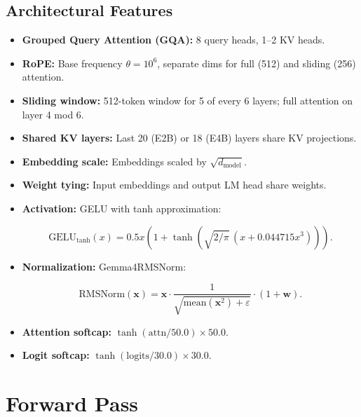 \documentclass[11pt,a4paper,openright]{book}
\begin{document}
\subsection{Architectural Features}

\begin{itemize}
	\item \textbf{Grouped Query Attention (GQA):} 8 query heads, 1--2 KV heads.
	\item \textbf{RoPE:} Base frequency $\theta = 10^6$, separate dims for full (512) and sliding (256) attention.
	\item \textbf{Sliding window:} 512-token window for 5 of every 6 layers; full attention on layer 4 mod 6.
	\item \textbf{Shared KV layers:} Last 20 (E2B) or 18 (E4B) layers share KV projections.
	\item \textbf{Embedding scale:} Embeddings scaled by $\sqrt{d_\text{model}}$.
	\item \textbf{Weight tying:} Input embeddings and output LM head share weights.
	\item \textbf{Activation:} GELU with tanh approximation:

	      \begin{equation}
		      \label{eq:gelu_tanh_inf}
		      \text{GELU}_\text{tanh}(x) = 0.5x\left(1 + \tanh\left(\sqrt{2/\pi}\,(x + 0.044715 x^3)\right)\right).
	      \end{equation}

	\item \textbf{Normalization:} Gemma4RMSNorm:

	      \begin{equation}
		      \label{eq:rmsnorm}
		      \text{RMSNorm}(\mathbf{x}) = \mathbf{x} \cdot \frac{1}{\sqrt{\text{mean}(\mathbf{x}^2) + \varepsilon}} \cdot (1 + \mathbf{w}).
	      \end{equation}

	\item \textbf{Attention softcap:} $\tanh(\text{attn} / 50.0) \times 50.0$.
	\item \textbf{Logit softcap:} $\tanh(\text{logits} / 30.0) \times 30.0$.
\end{itemize}

\section{Forward Pass}
\end{document}
